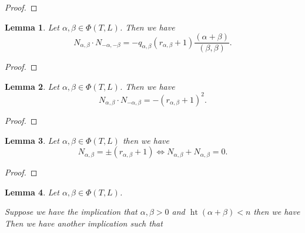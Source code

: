 \documentclass{article}
\newtheorem{lemma}{Lemma}[section]
\numberwithin{equation}{section}
\DeclareMathOperator{\height}{ht}
\begin{document}
\begin{proof}
\end{proof}

\begin{lemma}
Let $\alpha,\beta\in\Phi(T,L)$. Then we have
\begin{equation*}
N_{\alpha,\beta}\cdot N_{-\alpha,-\beta} = -q_{\alpha,\beta}(r_{\alpha,\beta}+1){\frac {(\alpha+\beta)} {(\beta,\beta)}}.
\end{equation*}
\end{lemma}

\begin{proof}
\end{proof}

\begin{lemma}
Let $\alpha,\beta\in\Phi(T,L)$. Then we have
\begin{equation*}
N_{\alpha,\beta}\cdot N_{-\alpha,\beta} = -(r_{\alpha,\beta}+1)^2.
\end{equation*}
\end{lemma}
\begin{proof}
\end{proof}

\begin{lemma}
Let $\alpha,\beta\in\Phi(T,L)$ then we have
\begin{equation*}
N_{\alpha,\beta}=\pm(r_{\alpha,\beta}+1) \Leftrightarrow N_{\alpha,\beta}+N_{\alpha,\beta} = 0.
\end{equation*}
\end{lemma}

\begin{proof}
\end{proof}

\begin{lemma}
Let $\alpha,\beta\in\Phi(T,L)$.\\
\par Suppose we have the implication that $\alpha,\beta>0$ and $\height(\alpha+\beta)<n$ then we have
\begin{equation*}
\end{equation*}
Then we have another implication such that 
\end{lemma}
\end{document}

